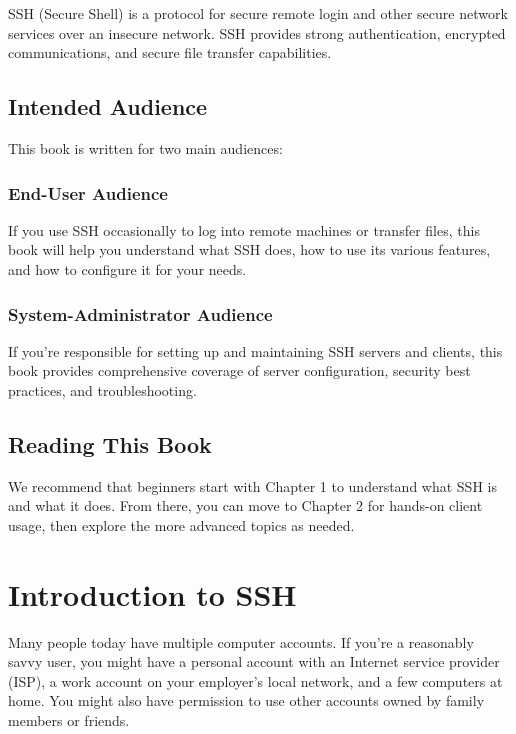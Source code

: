 \documentclass[12pt]{book}
\begin{document}
SSH (Secure Shell) is a protocol for secure remote login and other secure network services over an insecure network. SSH provides strong authentication, encrypted communications, and secure file transfer capabilities.

\section{Intended Audience}

This book is written for two main audiences:

\subsection{End-User Audience}

If you use SSH occasionally to log into remote machines or transfer files, this book will help you understand what SSH does, how to use its various features, and how to configure it for your needs.

\subsection{System-Administrator Audience}

If you're responsible for setting up and maintaining SSH servers and clients, this book provides comprehensive coverage of server configuration, security best practices, and troubleshooting.

\section{Reading This Book}

We recommend that beginners start with Chapter 1 to understand what SSH is and what it does. From there, you can move to Chapter 2 for hands-on client usage, then explore the more advanced topics as needed.

\mainmatter

\chapter{Introduction to SSH}

Many people today have multiple computer accounts. If you're a reasonably savvy user, you might have a personal account with an Internet service provider (ISP), a work account on your employer's local network, and a few computers at home. You might also have permission to use other accounts owned by family members or friends.
\end{document}
